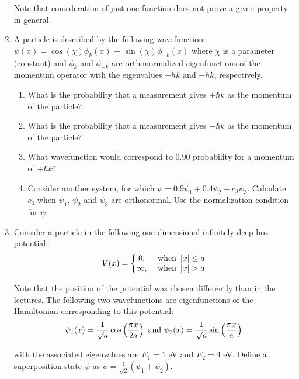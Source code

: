 \begin{enumerate}
Note that consideration of just one function does not prove a given property in general.


\item A particle is described by the following wavefunction: $\psi(x) = \cos(\chi)\phi_k(x)$ + $\sin(\chi)\phi_{-k}(x)$ where $\chi$ is a parameter (constant) and $\phi_k$ and $\phi_{-k}$ are orthonormalized eigenfunctions of the momentum operator with the eigenvalues $+\hbar k$ and $-\hbar k$, respectively.

\begin{enumerate}
\item What is the probability that a measurement gives $+\hbar k$ as the momentum of the particle?
\item What is the probability that a measurement gives $-\hbar k$ as the momentum of the particle?
\item What wavefunction would correspond to 0.90 probability for a momentum of $+\hbar k$?
\item Consider another system, for which $\psi = 0.9\psi_1 + 0.4\psi_2 + c_3\psi_3$. Calculate $c_3$ when $\psi_1$, $\psi_2$ and $\psi_3$ are orthonormal. Use the normalization condition for $\psi$.
\end{enumerate}


\item Consider a particle in the following one-dimensional infinitely deep box potential:
$$V(x) = \left\lbrace\begin{matrix}
0, & \textnormal{ when }\left|x\right| \le a\\
\infty, & \textnormal{ when }\left|x\right| > a\\
\end{matrix}\right.
$$

Note that the position of the potential was chosen differently than in the lectures. The following two wavefunctions are eigenfunctions of the Hamiltonian corresponding to this potential:
$$\psi_1(x) = \frac{1}{\sqrt{a}}\cos\left(\frac{\pi x}{2a}\right)\textnormal{ and } \psi_2(x) = \frac{1}{\sqrt{a}}\sin\left(\frac{\pi x}{a}\right)$$

with the associated eigenvalues are $E_1 = 1$ eV and $E_2 = 4$ eV. Define a superposition state $\psi$ as $\psi = \frac{1}{\sqrt{2}}\left(\psi_1 + \psi_2\right)$.


\end{enumerate}

